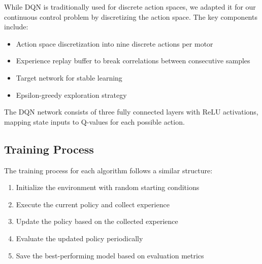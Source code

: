 \documentclass[12pt]{article}
\begin{document}
While DQN is traditionally used for discrete action spaces, we adapted it for our continuous control problem by discretizing the action space. The key components include:


\begin{itemize}
    \item Action space discretization into nine discrete actions per motor
    \item Experience replay buffer to break correlations between consecutive samples
    \item Target network for stable learning
    \item Epsilon-greedy exploration strategy
\end{itemize}


The DQN network consists of three fully connected layers with ReLU activations, mapping state inputs to Q-values for each possible action.


\subsection{Training Process}

The training process for each algorithm follows a similar structure:

    \begin{enumerate}
    \item Initialize the environment with random starting conditions
    \item Execute the current policy and collect experience
    \item Update the policy based on the collected experience
    \item Evaluate the updated policy periodically
    \item Save the best-performing model based on evaluation metrics
\end{enumerate}
\end{document}
